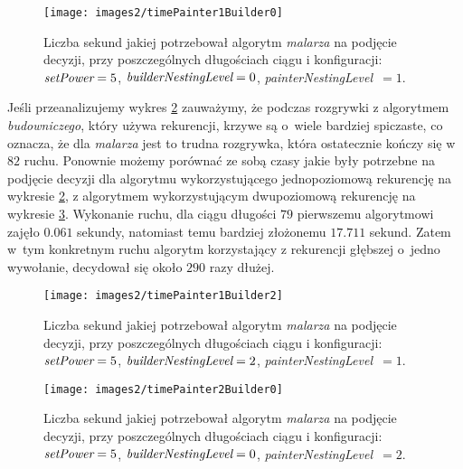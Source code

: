 \documentclass[document]{xmgr}
\begin{document}
\begin{figure}[tbh]
    \centering
    \caption{Liczba sekund jakiej potrzebował algorytm \emph{malarza} na podjęcie decyzji, przy poszczególnych długościach ciągu i konfiguracji: $\emph{setPower}=5$, $\emph{builderNestingLevel}=0$, \emph{painterNestingLevel}~$=1$.}
    \texttt{[image: images2/timePainter1Builder0]}
    \label{fig:painter1builder0}
\end{figure}

Jeśli przeanalizujemy wykres \ref{fig:painter1builder2} zauważymy, że podczas rozgrywki z algorytmem \emph{budowniczego}, który używa rekurencji, krzywe są o~wiele bardziej spiczaste, co oznacza, że dla \emph{malarza} jest to trudna rozgrywka, która ostatecznie kończy się w~$82$ ruchu. Ponownie możemy porównać ze sobą czasy jakie były potrzebne na podjęcie decyzji dla algorytmu wykorzystującego jednopoziomową rekurencję na wykresie \ref{fig:painter1builder2}, z algorytmem wykorzystującym dwupoziomową rekurencję na wykresie \ref{fig:painter2builder0}. Wykonanie ruchu, dla ciągu długości $79$ pierwszemu algorytmowi zajęło $0.061$ sekundy, natomiast temu bardziej złożonemu $17.711$ sekund. Zatem w~tym konkretnym ruchu algorytm korzystający z rekurencji głębszej o~jedno wywołanie, decydował się około $290$ razy dłużej.



\begin{figure}[tbh]
    \centering
    \caption{Liczba sekund jakiej potrzebował algorytm \emph{malarza} na podjęcie decyzji, przy poszczególnych długościach ciągu i konfiguracji: $\emph{setPower}=5$, $\emph{builderNestingLevel}=2$, \emph{painterNestingLevel}~$=1$.}
    \texttt{[image: images2/timePainter1Builder2]}
    \label{fig:painter1builder2}
\end{figure}

\begin{figure}[tbh]
    \centering
    \caption{Liczba sekund jakiej potrzebował algorytm \emph{malarza} na podjęcie decyzji, przy poszczególnych długościach ciągu i konfiguracji: $\emph{setPower}=5$, $\emph{builderNestingLevel}=0$, \emph{painterNestingLevel}~$=2$.}
    \texttt{[image: images2/timePainter2Builder0]}
    \label{fig:painter2builder0}
\end{figure}
\end{document}
